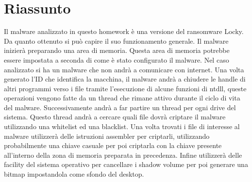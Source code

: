 \documentclass[a4paper,12pt]{article}
\begin{document}
\section{Riassunto}
Il malware analizzato in questo homework è una versione del ransomware Locky. Da quanto ottenuto si può capire il suo funzionamento generale. Il malware inizierà preparando una area di memoria. Questa area di memoria potrebbe essere impostata a seconda di come è stato configurato il malware. Nel caso analizzato si ha un malware che non andrà a comunicare con internet. Una volta generato l'ID che identifica la macchina, il malware andrà a chiudere le handle di altri programmi verso i file tramite l'esecuzione di alcune funzioni di ntdll, queste operazioni vengono fatte da un thread che rimane attivo durante il ciclo di vita del malware. Successivamente andrà a far partire un thread per ogni drive del sistema. Questo thread andrà a cercare quali file dovrà criptare il malware utilizzando una whitelist ed una blacklist. Una volta trovati i file di interesse al malware utilizzerà delle istruzioni assembler per criptarli, utilizzando probabilmente una chiave casuale per poi criptarla con la chiave presente all'interno della zona di memoria preparata in precedenza. Infine utilizzerà delle facility del sistema operativo per cancellare i shadow volume per poi generare una bitmap impostandola come sfondo del desktop. 
\end{document}
